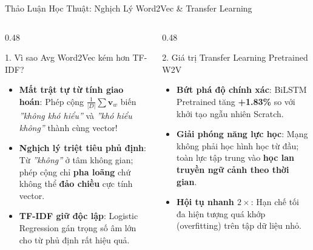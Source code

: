 \documentclass[aspectratio=169, 10pt]{beamer}
\begin{document}
\begin{frame}{Thảo Luận Học Thuật: Nghịch Lý Word2Vec \& Transfer Learning}
  \begin{columns}[T, onlytextwidth]
    \begin{column}{0.48\textwidth}
      \begin{alertblock}{1. Vì sao Avg Word2Vec kém hơn TF-IDF?}
        \fontsize{7.5}{9.5}\selectfont
        \begin{itemize}\setlength{\itemsep}{0.2em}
          \item \textbf{Mất trật tự từ tính giao hoán}: Phép cộng $\frac{1}{|D|}\sum \mathbf{v}_w$ biến \textit{''không khó hiểu''} và \textit{''khó hiểu không''} thành cùng vector!
          \item \textbf{Nghịch lý triệt tiêu phủ định}: Từ \textit{''không''} ở tâm không gian; phép cộng chỉ \textbf{pha loãng} chứ không thể \textbf{đảo chiều} cực tính vector.
          \item \textbf{TF-IDF giữ độc lập}: Logistic Regression gán trọng số âm lớn cho từ phủ định rất hiệu quả.
        \end{itemize}
      \end{alertblock}
    \end{column}
    \hfill
    \begin{column}{0.48\textwidth}
      \begin{exampleblock}{2. Giá trị Transfer Learning Pretrained W2V}
        \fontsize{7.5}{9.5}\selectfont
        \begin{itemize}\setlength{\itemsep}{0.2em}
          \item \textbf{Bứt phá độ chính xác}: BiLSTM Pretrained tăng \textbf{+1.83\%} so với khởi tạo ngẫu nhiên Scratch.
          \item \textbf{Giải phóng năng lực học}: Mạng không phải học hình học từ đầu; toàn lực tập trung vào \textbf{học lan truyền ngữ cảnh theo thời gian}.
          \item \textbf{Hội tụ nhanh $2\times$}: Hạn chế tối đa hiện tượng quá khớp (overfitting) trên tập dữ liệu nhỏ.
        \end{itemize}
      \end{exampleblock}
    \end{column}
  \end{columns}
\end{frame}
\end{document}
